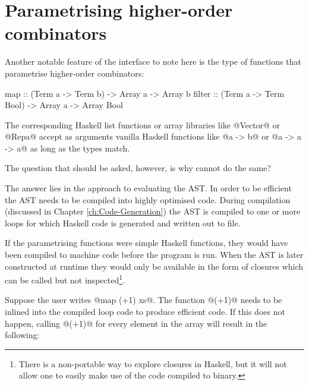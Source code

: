 \documentclass[preamble.tex]{subfiles}
\begin{document}



\section{Parametrising higher-order combinators}
\label{sec:Scalar-language}
\iscalarlang

Another notable feature of the interface to note here is the type of functions that parametrise higher-order combinators:

\begin{hscode}
map    :: (Term a -> Term b) -> Array a -> Array b
filter :: (Term a -> Term Bool) -> Array a -> Array Bool
\end{hscode}

The corresponding Haskell list functions or array libraries like @Vector@ or @Repa@ \cite{KCL+10} accept as arguments vanilla Haskell functions like @a -> b@ or @a -> a -> a@ as long as the types match.

The question that should be asked, however, is why cannot \LiveFusion do the same?

The answer lies in the approach to evaluating the AST. In order to be efficient the AST needs to be compiled into highly optimised code. During compilation (discussed in Chapter \ref{ch:Code-Generation}) the AST is compiled to one or more loops for which Haskell code is generated and written out to file.

If the parametrising functions were simple Haskell functions, they would have been compiled to machine code before the program is run. When the AST is later constructed at runtime they would only be available in the form of closures which can be called but not inspected\footnote{There is a non-portable way to explore closures in Haskell, but it will not allow one to easily make use of the code compiled to binary.}.

Suppose the user writes @map (+1) xs@. The function @(+1)@ needs to be inlined into the compiled loop code to produce efficient code. If this does not happen, calling @(+1)@ for every element in the array will result in the following:
\end{document}
